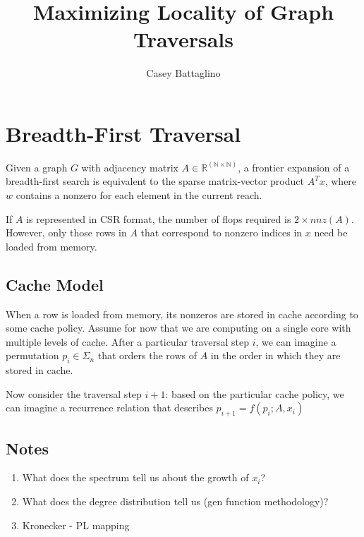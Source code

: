 \documentclass[11pt]{article}
\title{Maximizing Locality of Graph Traversals}
\author{Casey Battaglino}
\date{}
\begin{document}
\maketitle

\section{Breadth-First Traversal}

Given a graph $G$ with adjacency matrix $A \in \mathbb{R^{(N \times N)}}$, a frontier expansion of a breadth-first search is equivalent to the sparse matrix-vector product $A^Tx$, where $w$ contains a nonzero for each element in the current reach. 

If $A$ is represented in CSR format, the number of flops required is $2 \times nnz(A)$. However, only those rows in $A$ that correspond to nonzero indices in $x$ need be loaded from memory. 

\subsection{Cache Model}
When a row is loaded from memory, its nonzeros are stored in cache according to some cache policy. Assume for now that we are computing on a single core with multiple levels of cache. After a particular traversal step $i$, we can imagine a permutation $p_i \in \Sigma_n$ that orders the rows of $A$ in the order in which they are stored in cache. 

Now consider the traversal step $i+1$: based on the particular cache policy, we can imagine a recurrence relation that describes $p_{i+1}=f(p_i; A, x_i)$

\subsection{Notes}
\begin{enumerate}
\item What does the spectrum tell us about the growth of $x_i$?
\item What does the degree distribution tell us (gen function methodology)?
\item Kronecker - PL mapping
\end{enumerate}






\end{document}
